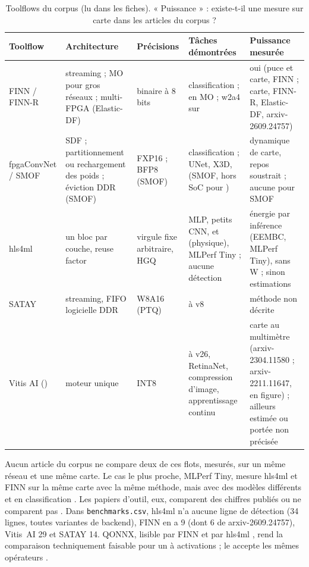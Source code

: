 \begin{table}[!htbp]
\centering\small
\caption{Toolflows du corpus (lu dans les fiches). « Puissance » : existe-t-il une mesure
sur carte dans les articles du corpus ?}
\label{tab:toolflows}
\begin{tabularx}{\textwidth}{@{}lLLLL@{}}
\toprule
Toolflow & Architecture & Précisions & Tâches démontrées & Puissance mesurée \\
\midrule
FINN / FINN-R & streaming ; MO pour gros réseaux ; multi-FPGA (Elastic-DF) & binaire à
  8 bits & classification ;  en MO ;  w2a4 sur  & oui (puce et
  carte, FINN ; carte, FINN-R, Elastic-DF, arxiv-2609.24757) \\
fpgaConvNet / SMOF & SDF ; partitionnement ou rechargement des poids ; éviction DDR (SMOF)
  & FXP16 ; BFP8 (SMOF) & classification ; UNet, X3D,  (SMOF, hors SoC pour
  ) & dynamique de carte, repos soustrait ; aucune pour SMOF \\
hls4ml & un bloc par couche, reuse factor & virgule fixe arbitraire, HGQ & MLP, petits CNN,
   et  (physique), MLPerf Tiny ; aucune détection & énergie par inférence (EEMBC,
  MLPerf Tiny), sans W ; sinon estimations \\
SATAY & streaming, FIFO logicielle DDR & W8A16 (PTQ) &  à v8 & méthode non
  décrite \\
Vitis AI () & moteur unique & INT8 &  à v26, RetinaNet, compression
  d'image, apprentissage continu & carte au multimètre (arxiv-2304.11580 ; arxiv-2211.11647,
  en figure) ; ailleurs estimée ou portée non précisée \\
\bottomrule
\end{tabularx}
\end{table}

Aucun article du corpus ne compare deux de ces flots, mesurés, sur un même réseau et une
même carte. Le cas le plus proche, MLPerf Tiny, mesure hls4ml et FINN sur la même carte
avec la même méthode, mais avec des modèles différents et en classification
\citep[Table~5]{arxiv-2206.11791-open-source-fpga-ml-codesign}\pp{}. Les papiers d'outil,
eux, comparent des chiffres publiés
\citep[§2.6]{2018-venieris-toolflows-mapping-convolutional-neural-networks} ou ne comparent
pas \citep{arxiv-2512.01463-hls4ml-flexible-open-source-platform,arxiv-2103.05579-hls4ml-open-source-codesign-workflow}.
Dans \texttt{benchmarks.csv}, hls4ml n'a aucune ligne de détection (34 lignes, toutes
variantes de backend), FINN en a 9 (dont 6 de arxiv-2609.24757), Vitis~AI 29 et SATAY 14.
QONNX, lisible par FINN et par hls4ml
\citep[§VI]{arxiv-2206.07527-qonnx-representing-arbitrary-precision-quantized}\pp{}, rend
la comparaison techniquement faisable pour un  à activations  ; le  accepte les
mêmes opérateurs \citep[§III-B]{arxiv-2607.13106-no-attention-no-problem-dpu}\pp{}.
